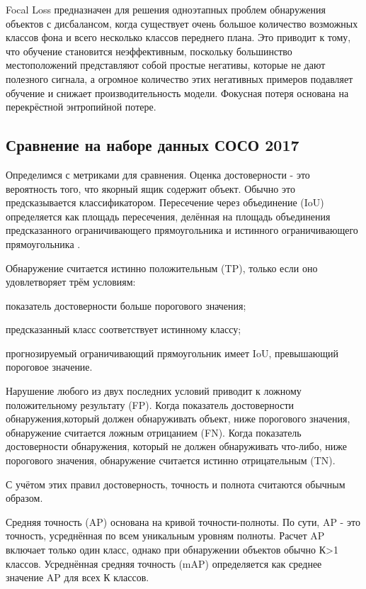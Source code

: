 Focal Loss предназначен для решения одноэтапных проблем обнаружения объектов с дисбалансом, когда существует очень большое количество возможных классов фона и всего несколько классов переднего плана. Это приводит к тому, что обучение становится неэффективным, поскольку большинство местоположений представляют собой простые негативы, которые не дают полезного сигнала, а огромное количество этих негативных примеров подавляет обучение и снижает производительность модели. Фокусная потеря основана на перекрёстной энтропийной потере.

\subsection{Сравнение на наборе данных СОСО 2017}
Определимся с метриками для сравнения. Оценка достоверности - это вероятность того, что якорный ящик содержит объект. Обычно это предсказывается классификатором. Пересечение через объединение (IoU) определяется как площадь пересечения, делённая на площадь объединения предсказанного ограничивающего прямоугольника и истинного ограничивающего прямоугольника \cite{metr}.

Обнаружение считается истинно положительным (TP), только если оно удовлетворяет трём условиям: 
\begin{enumerate*}
	\item показатель достоверности больше порогового значения; 
	\item предсказанный класс соответствует истинному классу; 
	\item прогнозируемый ограничивающий прямоугольник имеет IoU, превышающий пороговое значение.
\end{enumerate*}

Нарушение любого из двух последних условий приводит к ложному положительному результату (FP). Когда показатель достоверности обнаружения,который должен обнаруживать объект, ниже порогового значения, обнаружение считается ложным отрицанием (FN). Когда показатель достоверности обнаружения, который не должен обнаруживать что-либо, ниже порогового значения, обнаружение считается истинно отрицательным (TN). 

С учётом этих правил достоверность, точность и полнота считаются обычным образом. 

Средняя точность (AP) основана на кривой точности-полноты. По сути, AP - это точность, усреднённая по всем уникальным уровням полноты.  Расчет AP включает только один класс, однако при обнаружении объектов обычно К>1 классов. Усреднённая средняя точность (mAP) определяется как среднее значение AP для всех К классов.

